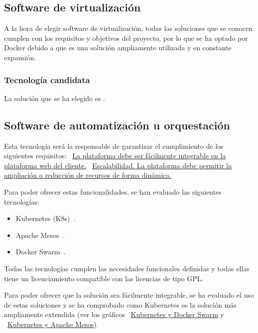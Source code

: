 \subsection{Software de virtualización}
\par A la hora de elegir software de virtualización, todas las soluciones que se conocen cumplen con los requisitos y objetivos del proyecto, por lo que se ha optado por Docker debido a que es una solución ampliamente utilizada y en constante
expansión.

\subsubsection{Tecnología candidata}
\par La solución que se ha elegido es \cite{docker}.

\subsection{Software de automatización u orquestación}
\par Esta tecnología será la responsable de garantizar el cumplimiento de los siguientes requisitos:
{~\hyperref[req:facilidad]{La plataforma debe ser fácilmente integrable en la plataforma web del cliente.}}
{~\hyperref[req:escalado]{Escalabilidad. La plataforma debe permitir la ampliación o reducción de recursos de forma dinámica.}}

\par Para poder ofrecer estas funcionalidades, se han evaluado las siguientes tecnologías:
\begin{itemize}
  \item Kubernetes (K8s)~\cite{kubernetes}.
  \item Apache Mesos~\cite{mesos}.
  \item Docker Swarm~\cite{swarm}.
\end{itemize}

\par Todas las tecnologías cumplen las necesidades funcionales definidas y todas ellas tiene un licenciamiento compatible con las licencias de tipo GPL.

\par Para poder ofrecer que la solución sea fácilmente integrable, se ha evaluado el uso de estas soluciones y se ha comprobado como Kubernetes es la solución más ampliamente extendida (ver los gráficos
{~\hyperref[fig:KubernetesSwarm]{Kubernetes y Docker Swarm}} y {~\hyperref[fig:KubernetesMesos]{Kubernetes y Apache Mesos}}).

